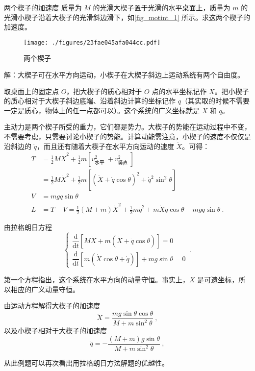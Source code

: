 \begin{example}{两个楔子的加速度}
质量为 $M$ 的光滑大楔子置于光滑的水平桌面上，质量为 $m$ 的光滑小楔子沿着大楔子的光滑斜边滑下，如\autoref{fig_motint_1} 所示。求这两个楔子的加速度。
\begin{figure}[ht]
\centering
\texttt{[image: ./figures/23fae045afa044cc.pdf]}
\caption{两个楔子} \label{fig_motint_1}
\end{figure}

解：大楔子可在水平方向运动，小楔子在大楔子斜边上运动系统有两个自由度。

取桌面上的固定点 $O$，把大楔子的质心相对于 $O$ 点的水平坐标记作 $X $。把小楔子的质心相对于大楔子斜边底端、沿着斜边计算的坐标记作 $q$（其实取的时候不需要一定是质心，物体上的任一点都可以）。这个系统的广义坐标就是 $X $ 和 $q $。

主动力是两个楔子所受的重力，它们都是势力。大楔子的势能在运动过程中不变，不需要考虑，只需要讨论小楔子的势能。计算动能需注意，小楔子的速度不仅仅是沿斜边的 $\dot q$，而且还有随着大楔子在水平方向运动的速度 $\dot X$。可得：
\begin{equation}
\begin{aligned} T &=\frac{1}{2} M \dot{X}^{2}+\frac{1}{2} m\left[v_{\text {水平 }}^{2}+v_{\text {竖直 }}^{2}\right] \\ &=\frac{1}{2} M \dot{X}^{2}+\frac{1}{2} m\left[(\dot{X}+\dot{q} \cos \theta)^{2}+\dot{q}^{2} \sin ^{2} \theta\right] \\ V &=m g q \sin \theta \\ L &=T-V=\frac{1}{2}(M+m) \dot{X}^{2}+\frac{1}{2} m \dot{q}^{2}+m \dot{X} \dot{q} \cos \theta-m g q \sin \theta~. \end{aligned}
\end{equation}

由拉格朗日方程
\begin{equation}
\begin{cases}
\dfrac{\mathrm{d}}{\mathrm{d} t}[M \dot{X}+m(\dot{X}+\dot{q} \cos \theta)]=0 \\ \dfrac{\mathrm{d}}{\mathrm{d} t}[m(\dot{X} \cos \theta+\dot{q})]+m g \sin \theta=0
\end{cases}~.
\end{equation}

第一个方程指出，这个系统在水平方向的动量守恒。事实上，$X$ 是可遗坐标，所以相应的广义动量守恒。

由运动方程解得大楔子的加速度
\begin{equation}
\ddot{X}=\frac{m g \sin \theta \cos \theta}{M+m \sin ^{2} \theta}~,
\end{equation}
以及小楔子相对于大楔子的加速度
\begin{equation}
\ddot{q}=-\frac{(M+m) g \sin \theta}{M+m \sin ^{2} \theta}~,
\end{equation}
\end{example}
从此例题可以再次看出用拉格朗日方法解题的优越性。


